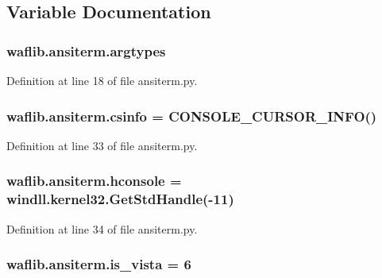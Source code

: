 \subsection{Variable Documentation}
\subsubsection[{\texorpdfstring{argtypes}{argtypes}}]{\setlength{\rightskip}{0pt plus 5cm}waflib.\+ansiterm.\+argtypes}\hypertarget{namespacewaflib_1_1ansiterm_a9aff23048a11d61e457650af047db8aa}{}\label{namespacewaflib_1_1ansiterm_a9aff23048a11d61e457650af047db8aa}


Definition at line 18 of file ansiterm.\+py.

\subsubsection[{\texorpdfstring{csinfo}{csinfo}}]{\setlength{\rightskip}{0pt plus 5cm}waflib.\+ansiterm.\+csinfo = {\bf C\+O\+N\+S\+O\+L\+E\+\_\+\+C\+U\+R\+S\+O\+R\+\_\+\+I\+N\+FO}()}\hypertarget{namespacewaflib_1_1ansiterm_a009aef0fcd8f29f1fabc093da0d94129}{}\label{namespacewaflib_1_1ansiterm_a009aef0fcd8f29f1fabc093da0d94129}


Definition at line 33 of file ansiterm.\+py.

\subsubsection[{\texorpdfstring{hconsole}{hconsole}}]{\setlength{\rightskip}{0pt plus 5cm}waflib.\+ansiterm.\+hconsole = windll.\+kernel32.\+Get\+Std\+Handle(-\/11)}\hypertarget{namespacewaflib_1_1ansiterm_a2bcb8c0ee13517e8077870c44f8aad61}{}\label{namespacewaflib_1_1ansiterm_a2bcb8c0ee13517e8077870c44f8aad61}


Definition at line 34 of file ansiterm.\+py.

\subsubsection[{\texorpdfstring{is\+\_\+vista}{is_vista}}]{ waflib.\+ansiterm.\+is\+\_\+vista = 6}\hypertarget{namespacewaflib_1_1ansiterm_a9eae986391aa97704f9e307a40a3a7b6}{}\label{namespacewaflib_1_1ansiterm_a9eae986391aa97704f9e307a40a3a7b6}


